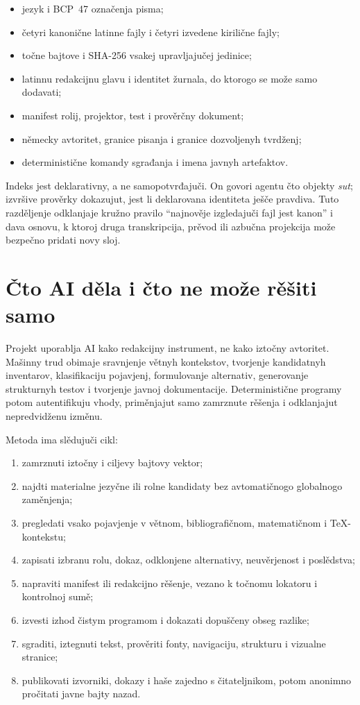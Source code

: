 \documentclass[11pt]{article}
\begin{document}
\begin{itemize}
\item jezyk i BCP~47 označenja pisma;
\item četyri kanonične latinne fajly i četyri izvedene kirilične fajly;
\item točne bajtove i SHA-256 vsakej upravljajučej jedinice;
\item latinnu redakcijnu glavu i identitet žurnala, do ktorogo se može samo dodavati;
\item manifest rolij, projektor, test i prověrčny dokument;
\item německy avtoritet, granice pisanja i granice dozvoljenyh tvrdženj;
\item deterministične komandy sgrađanja i imena javnyh artefaktov.
\end{itemize}

Indeks jest deklarativny, a ne samopotvrđajuči. On govori agentu čto objekty \emph{sut}; izvršive prověrky dokazujut, jest li deklarovana identiteta ješče pravdiva. Tuto razděljenje odklanjaje kružno pravilo ``najnověje izgledajuči fajl jest kanon'' i dava osnovu, k ktoroj druga transkripcija, prěvod ili azbučna projekcija može bezpečno pridati novy sloj.

\section{Čto AI děla i čto ne može rěšiti samo}

Projekt uporablja AI kako redakcijny instrument, ne kako iztočny avtoritet. Mašinny trud obimaje sravnjenje větnyh kontekstov, tvorjenje kandidatnyh inventarov, klasifikaciju pojavjenj, formulovanje alternativ, generovanje strukturnyh testov i tvorjenje javnoj dokumentacije. Deterministične programy potom autentifikuju vhody, priměnjajut samo zamrznute rěšenja i odklanjajut nepredvidženu izměnu.

Metoda ima slědujuči cikl:

\begin{enumerate}
\item zamrznuti iztočny i ciljevy bajtovy vektor;
\item najdti materialne jezyčne ili rolne kandidaty bez avtomatičnogo globalnogo zaměnjenja;
\item pregledati vsako pojavjenje v větnom, bibliografičnom, matematičnom i TeX-kontekstu;
\item zapisati izbranu rolu, dokaz, odklonjene alternativy, neuvěrjenost i poslědstva;
\item napraviti manifest ili redakcijno rěšenje, vezano k točnomu lokatoru i kontrolnoj sumě;
\item izvesti izhod čistym programom i dokazati dopuščeny obseg razlike;
\item sgraditi, iztegnuti tekst, prověriti fonty, navigaciju, strukturu i vizualne stranice;
\item publikovati izvorniki, dokazy i haše zajedno s čitateljnikom, potom anonimno pročitati javne bajty nazad.
\end{enumerate}
\end{document}
